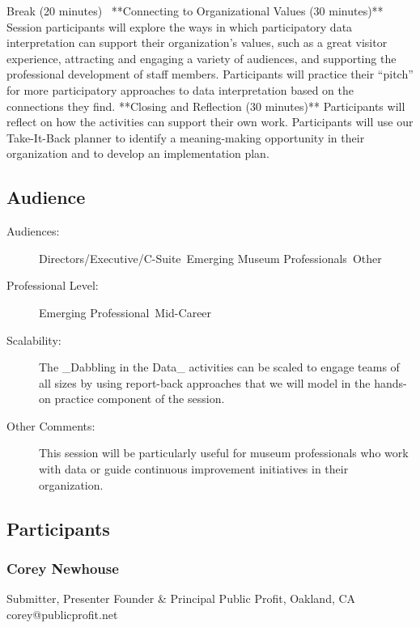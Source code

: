 \documentclass{report}
\begin{document}
\begin{description}
Break (20 minutes) 
**Connecting to Organizational Values (30 minutes)**
Session participants will explore the ways in which participatory data interpretation can support their organization’s values, such as a great visitor experience, attracting and engaging a variety of audiences, and supporting the professional development of staff members. Participants will practice their “pitch” for more participatory approaches to data interpretation based on the connections they find.
**Closing and Reflection (30 minutes)**
Participants will reflect on how the activities can support their own work. Participants will use our Take-It-Back planner to identify a meaning-making opportunity in their organization and to develop an implementation plan.

                \end{description}
              \subsection*{Audience}
                \begin{description}
                  \item [Audiences:]Directors/Executive/C-Suite~Emerging Museum Professionals~Other~
                  \item[Professional Level:]Emerging Professional~Mid-Career~
                \item[Scalability:] The \_Dabbling in the Data\_ activities can be scaled to engage teams of all sizes by using report-back approaches that we will model in the hands-on practice component of the session.

							
              \item[Other Comments:] This session will be particularly useful for museum professionals who work with data or guide continuous improvement initiatives in their organization.
              \end{description}
            \subsection*{Participants}
              \subsubsection*{ Corey Newhouse }
              Submitter, Presenter\newline
              Founder \& Principal\newline
              Public Profit, Oakland, CA
              \newline
              corey@publicprofit.net\newline
              
\end{document}
